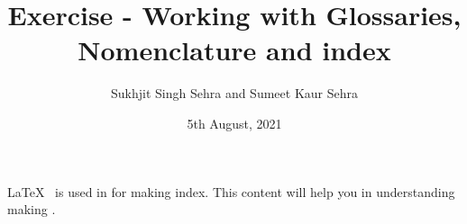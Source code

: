 \documentclass[11pt,a4paper]{article}
\title{Exercise - Working with Glossaries, Nomenclature and index}
\author{Sukhjit Singh Sehra and Sumeet Kaur Sehra}
\date{5th August, 2021}
\begin{document}
\maketitle

\LaTeX\ \index{\LaTeX} is used in for making index. This content will help you in understanding making .

\printindex
\end{document}
